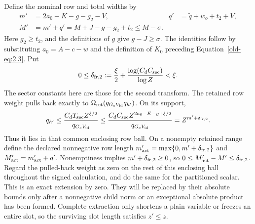 \documentclass[11pt,a4paper]{article}
\numberwithin{equation}{section}
\numberwithin{figure}{section}
\theoremstyle{definition}
\theoremstyle{remark}
\begin{document}
Define the nominal row and total widths by
\begin{equation}
 \begin{aligned}
 m'&=2a_0-K-g-g_2-V,&
 q'&=\widetilde q+w_o+t_2+V,\\
 M'&=m'+q'
    =M+J-g-g_2+t_2
    \le M-\sigma.
 \end{aligned}
 \label{old-eq:2.13}
\end{equation}
Here \(g_2\ge t_2\), and the definitions of \(g\) give
\(g-J\ge\sigma\).  The identities follow by substituting
\(a_0=A-c-w\) and the definition of \(K_0\) preceding
Equation~\eqref{old-eq:2.3}.  Put
\[
 0\le\delta_{{\rm fr},2}:=\frac\xi2+
       \frac{\log(C_dC_{\rm sec})}{\log Z}<\xi.
\]
The sector constants here are those for the second transform.
The retained row weight pulls back exactly to
\(\Omega_{\rm ret}(q_{G_cV_{\rm id}}q_{h'})\).  On its support,
\[
 q_{h'}\le
 \frac{C_dT_{\rm sec}Z^{\xi/2}}{q_{G_cV_{\rm id}}}
 \le\frac{C_dC_{\rm sec}Z^{2a_0-K-g+\xi/2}}
          {q_{G_cV_{\rm id}}}
 =Z^{m'+\delta_{{\rm fr},2}}.
\]
Thus it lies in that common enclosing row ball.  On a
nonempty retained range define the declared nonnegative row length
\(m'_{\rm act}=\max\{0,m'+\delta_{{\rm fr},2}\}\) and
\(M'_{\rm act}=m'_{\rm act}+q'\).  Nonemptiness implies
\(m'+\delta_{{\rm fr},2}\ge0\), so
\(0\le M'_{\rm act}-M'\le\delta_{{\rm fr},2}\).
Regard the pulled-back weight as zero on the rest of this enclosing
ball throughout the signed calculation, and do the same for the
partitioned scalar.  This is an exact extension by zero.  They will
be replaced by their absolute bounds only after a nonnegative child
norm or an exceptional absolute product has been formed.
Complete extraction only shortens a plain variable or freezes an
entire slot, so the surviving slot length satisfies \(z'\le z\).
\end{document}
